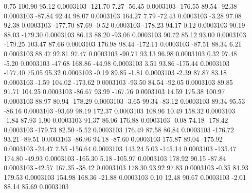         0.75      100.90       95.12     0.0003103
     -121.70        7.27      -56.45     0.0003103
     -176.55       89.54      -92.38     0.0003103
      -87.84       92.44       98.07     0.0003103
      164.27        7.79      -72.43     0.0003103
       -3.28       97.08       92.38     0.0003103
     -177.70       87.69       -0.52     0.0003103
     -178.23       94.17        0.12     0.0003103
       90.19       88.03     -179.30     0.0003103
       86.13       88.20      -93.06     0.0003103
       90.72       85.12       93.00     0.0003103
     -179.25      103.47       87.66     0.0003103
      176.98       98.44     -172.11     0.0003103
      -87.51       88.34        6.21     0.0003103
       88.47       92.81       97.47     0.0003103
      -90.71       93.13       96.98     0.0003103
        0.32       97.48       -5.20     0.0003103
      -47.68      168.86      -44.98     0.0003103
        3.51       93.86     -175.44     0.0003103
     -177.40       75.05       95.32     0.0003103
       -0.19       89.85       -1.81     0.0003103
       -2.39       87.87       83.18     0.0003103
       -1.59      104.02     -173.62     0.0003103
      -93.50       84.54      -92.05     0.0003103
       89.85       91.71      104.25     0.0003103
      -86.67       93.99     -167.76     0.0003103
       14.59      175.38      100.97     0.0003103
       88.97       80.94     -178.29     0.0003103
       -3.65       99.34      -83.12     0.0003103
       89.34       95.53      -86.16     0.0003103
      -93.69       98.19      172.37     0.0003103
      108.96       10.49      158.32     0.0003103
       -1.84       87.93        1.90     0.0003103
       91.37       86.06      176.88     0.0003103
       -0.08       74.18     -178.42     0.0003103
     -179.73       82.50       -5.52     0.0003103
      176.49       87.58       86.84     0.0003103
     -176.72       93.21      -89.51     0.0003103
      -86.96       94.18      -87.60     0.0003103
      175.87       89.04     -175.92     0.0003103
      -24.47        7.55     -156.64     0.0003103
      143.24        5.03     -145.14     0.0003103
     -135.47      174.80      -49.93     0.0003103
     -165.30        5.18     -105.97     0.0003103
      178.92       90.15      -87.84     0.0003103
      -42.57      167.35      -38.42     0.0003103
      178.30       93.92       97.83     0.0003103
       -0.35       84.93      179.53     0.0003103
      154.98      168.36      -21.88     0.0003103
        0.10       12.48       90.67     0.0003103
       -2.01       88.14       85.69     0.0003103
